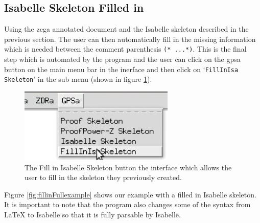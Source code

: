 \subsection{Isabelle Skeleton Filled in}

Using the \gls{zcga} annotated document and the Isabelle skeleton described in the previous section. The user can then automatically fill in the missing information which is needed between the comment parenthesis \verb|(* ...*)|. This is the final step which is automated by the program and the user can click on the \gls{gpsa} button on the main menu bar in the inerface and then click on `\texttt{FillInIsa Skeleton}' in the sub menu (shown in figure \ref{fig:fillinisa}).

\begin{figure}[H]
\centering
\includegraphics[scale=0.45]{Figures/fullexample/fillinisa.png}
\caption{The Fill in Isabelle Skeleton button the interface which allows the user to fill in the skeleton they previously created. \label{fig:fillinisa}}
\end{figure}

Figure \ref{fig:fillinFullexample} shows our example with a filled in Isabelle skeleton. It is important to note that the program also changes some of the syntax from \LaTeX{} to Isabelle so that it is fully parsable by Isabelle.

